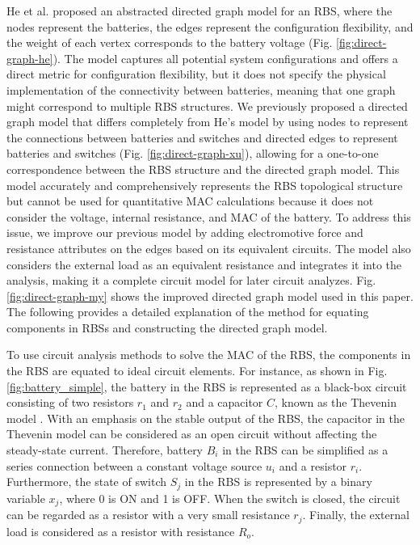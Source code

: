 \documentclass{article}
\begin{document}
He et al. \cite{heExploringAdaptiveReconfiguration2013} proposed an abstracted directed graph model for an RBS, where the nodes represent the batteries, the edges represent the configuration flexibility, and the weight of each vertex corresponds to the battery voltage (Fig. \ref{fig:direct-graph-he}). 
The model captures all potential system configurations and offers a direct metric for configuration flexibility, but it does not specify the physical implementation of the connectivity between batteries, meaning that one graph might correspond to multiple RBS structures.
We previously proposed a directed graph model that differs completely from He's model by using nodes to represent the connections between batteries and switches and directed edges to represent batteries and switches (Fig. \ref{fig:direct-graph-xu}), allowing for a one-to-one correspondence between the RBS structure and the directed graph model. 
This model accurately and comprehensively represents the RBS topological structure but cannot be used for quantitative MAC calculations because it does not consider  the voltage, internal resistance, and MAC of the battery. 
To address this issue, we improve our previous model by adding electromotive force and resistance attributes on the edges based on its equivalent circuits.
The model also considers the external load as an equivalent resistance and integrates it into the analysis, making it a complete circuit model for later circuit analyzes.
Fig. \ref{fig:direct-graph-my} shows the improved directed graph model used in this paper.
The following  provides a detailed explanation of the method for equating components in RBSs and constructing the directed graph model.


To use circuit analysis methods to solve the MAC of the RBS, the components in the RBS are equated to ideal circuit elements.
For instance, as shown in Fig. \ref{fig:battery_simple}, the battery in the RBS is represented as a black-box circuit consisting of two resistors $r_1$ and $r_2$ and a capacitor $C$, known as the Thevenin model \cite{hongwenheStateofChargeEstimationLithiumIon2011,mousavig.VariousBatteryModels2014}.
With an emphasis on the stable output of the RBS, the capacitor in the Thevenin model can be considered as an open circuit without affecting the steady-state current.
Therefore,  battery $B_i$ in the RBS can be simplified as a series connection between a constant voltage source $u_{i}$ and a resistor $r_{i}$.
Furthermore, the state of switch $S_j$ in the RBS is represented by a binary variable $x_j$, where 0 is ON and 1 is OFF.
When the switch is closed, the circuit can be regarded as a resistor with a very small resistance $r_{j}$.
Finally, the external load is considered as a resistor with resistance $R_o$.
\end{document}
